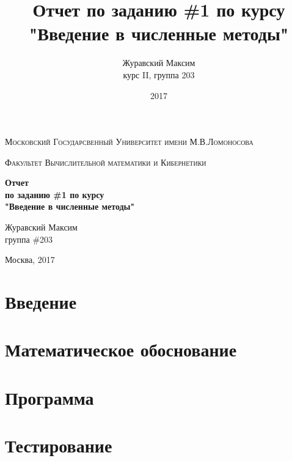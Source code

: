 \documentclass[12pt, a4paper]{report}
\title{Отчет по заданию \#1 по курсу "Введение в численные методы"}
\author{Журавский Максим \\
        курс II, группа 203}
\date{2017}
\begin{document}
\begin{titlepage}
    \centering
    {\scshape\large Московский Государсвенный Университет имени М.В.Ломоносова \par}
    {\scshape\large Факультет Вычислительной математики и Кибернетики \par}
	\vspace{3cm}
	{\huge\bfseries Отчет \\
                    по заданию \#1 по курсу \\
                    "Введение в численные методы" \par}
    \vspace{5cm}
    \raggedleft
	{\large Журавский Максим \\
            группа \#203 \par}
    \vfill
    \centering
	{\large Москва, 2017 \par}
\end{titlepage}

\tableofcontents
\newpage

\chapter{Введение}

\newpage

\chapter{Математическое обоснование}

\newpage

\chapter{Программа}

\newpage

\chapter{Тестирование}

\newpage
\end{document}
